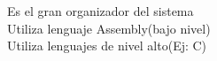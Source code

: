 \documentclass[preview]{standalone}
\begin{document}
Es el gran organizador del sistema\\Utiliza lenguaje Assembly(bajo nivel)\\Utiliza lenguajes de nivel alto(Ej: C)\\
\end{document}
